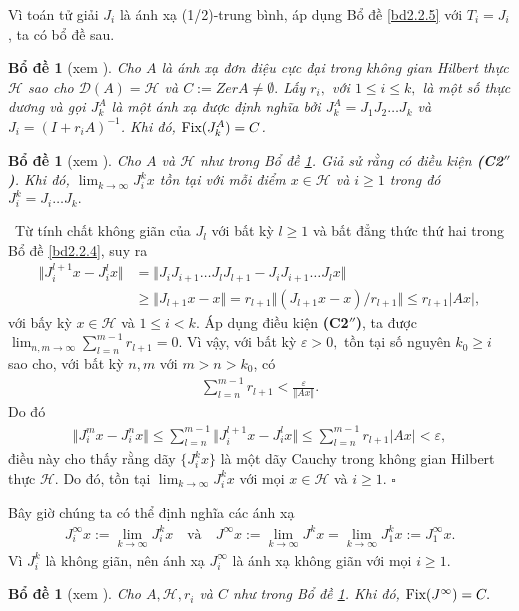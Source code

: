 \documentclass[14pt, oneside,A4paper]{book}
\theoremstyle{plain}
\newcommand{\eproof}{\hfill $\square$}
\newcommand{\chm}{{\bf  Chứng minh.}}
\newtheorem{bd}[theorem]{Bổ đề}
\begin{document}
Vì toán tử giải $J_{i}$ là ánh xạ (1/2)-trung bình, áp dụng Bổ đề \ref{bd2.2.5} với $T_{i}=J_{i}$, ta có bổ đề sau.

\begin{bd}[xem \cite{BHN}] \label{bd2.3.2}
Cho $A$ là ánh xạ đơn điệu cực đại trong không gian Hilbert thực $\mathcal H$ sao cho $\mathcal{D}(A)=\mathcal H$ và $C:=ZerA \neq \emptyset.$ Lấy $r_{i},$ với $1 \leq i \leq k,$ là một số thực dương và gọi $J^A_{k}$ là một ánh xạ được định nghĩa bởi $J^A_{k}=J_{1}J_{2}\dots J_{k}$ và $J_{i}=(I+r_{i}A)^{-1}$. Khi đó, $\text{\rm Fix}(J^A_{k})=C$.
\end{bd}

\begin{bd}[xem \cite{BHN}]\label{bd2.3.3}
Cho $A$ và $\mathcal H$ như trong Bổ đề \ref{bd2.3.2}. Giả sử rằng có điều kiện {\rm \bf ({C2}$''$)}. Khi đó, $\lim_{k \rightarrow \infty} J_{i}^kx $ tồn tại với mỗi điểm  $x \in \mathcal H$ và $i \geq 1$ trong đó $J_{i}^{k} = J_{i}\dots J_{k}.$
\end{bd}
\noindent \chm \rm \ 
Từ tính chất không giãn của $J_{l}$ với bất kỳ $l \geq 1$ và bất đẳng thức thứ hai trong Bổ đề \ref{bd2.2.4}, suy ra
\begin{align*}
\Vert J_{i}^{l+1}x-J_{i}^{l}x \Vert &= \Vert J_{i}J_{i+1}\dots J_{l}J_{l+1}-J_{i}J_{i+1}\dots J_{l}x \Vert \\
& \geq \Vert J_{l+1}x-x \Vert = r_{l+1} \Vert (J_{l+1}x-x)/r_{l+1} \Vert \leq r_{l+1} \vert Ax \vert,
\end{align*}
với bấy kỳ $x \in \mathcal H$ và $1 \leq i <k.$ Áp dụng điều kiện {\bf ({C2}$''$)}, ta được $\lim_{n,m \rightarrow \infty} \sum_{l=n}^{m-1} r_{l+1} =0 $. Vì vậy, với bất kỳ $\varepsilon  > 0,$ tồn tại số nguyên $k_{0} \geq i$ sao cho, với bất kỳ $n,m$ với $m>n>k_{0}$, có
\begin{align*}
\sum_{l=n}^{m-1} r_{l+1}<\frac{\varepsilon }{\Vert Ax \Vert}.
\end{align*}
Do đó
\begin{align*}
\Vert J_{i}^{m}x-J_{i}^{n}x \Vert \leq \sum_{l=n}^{m-1} \Vert J_{i}^{l+1}x-J_{i}^{l}x \Vert \leq \sum_{l=n}^{m-1} r_{l+1} \vert Ax \vert < \varepsilon ,
\end{align*}
điều này cho thấy rằng dãy $\{ J_{i}^{k}x \} $ là một dãy Cauchy trong không gian Hilbert thực $\mathcal H$. Do đó, tồn tại $\lim_{k \rightarrow \infty}J_{i}^{k}x $ với mọi $x \in \mathcal H$ và $i \geq 1.$
\eproof


Bây giờ chúng ta có thể định nghĩa các ánh xạ
\begin{align*}
J_{i}^{\infty}x:=\lim_{k\rightarrow \infty} J_{i}^{k}x   \quad \text{và} \quad   J^{\infty}x:=\lim_{k \rightarrow \infty}J^{k}x=\lim_{k \rightarrow \infty}J_{1}^{k}x:=J_{1}^{\infty}x.
\end{align*}
Vì $J_{i}^{k}$ là không giãn, nên ánh xạ $J_{i}^{\infty}$ là ánh xạ không giãn với mọi $i \geq 1$.
\begin{bd}[xem \cite{BHN}] \label{bd2.3.4}
Cho $A,\mathcal H,r_{i}$ và $C$ như trong Bổ đề \ref{bd2.3.3}. Khi đó, $\text{\rm Fix}(J^{\infty})=C.$
\end{bd}
\end{document}

